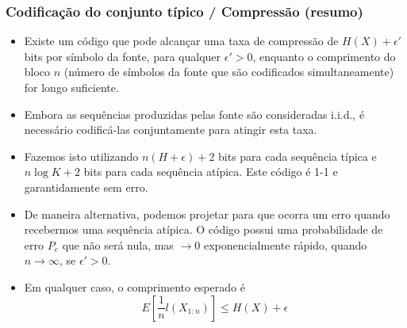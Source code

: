 \begin{frame}[allowframebreaks]
  \frametitle{Codificação do conjunto típico / Compressão (resumo)}
  \begin{itemize}
  \item Existe um código que pode alcançar uma taxa de compressão de $H(X) + \epsilon'$ bits por símbolo da fonte, para
        qualquer $\epsilon'>0$, enquanto o comprimento do bloco $n$ (número de símbolos da fonte que são codificados simultaneamente) for longo suficiente.
  \item Embora as sequências produzidas pelas fonte são consideradas i.i.d., é necessário codificá-las conjuntamente para atingir esta taxa.
  \item Fazemos isto utilizando $n(H+\epsilon)+2$ bits para cada sequência típica e $n \log K + 2$ bits para cada sequência atípica. Este código
        é 1-1 e garantidamente sem erro.
  \item De maneira alternativa, podemos projetar para que ocorra um erro quando recebermos uma sequência atípica. O código possui uma
        probabilidade de erro $P_e$ que não será nula, mas $\rightarrow 0$ exponencialmente rápido, quando $n \rightarrow \infty$, se $\epsilon'>0$.
  \item Em qualquer caso, o comprimento esperado é
        \begin{equation}
        E[\frac{1}{n} l (X_{1:n})] \leq H(X) + \epsilon
        \end{equation}
  \end{itemize}
\end{frame}


